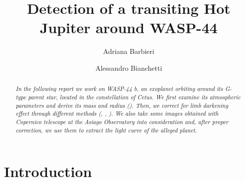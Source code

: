\documentclass[a4paper,11pt,twocolumn]{article}
\title{Detection of a transiting Hot Jupiter around WASP-44}
\author{Adriana Barbieri \and Alessandro Bianchetti}
\begin{document}
\maketitle

\begin{abstract}

\emph{In the following report we work on WASP-44 b, an exoplanet orbiting 
around its G-type parent star, located in the constellation of Cetus. 
We first examine its atmospheric parameters and derive its mass and 
radius (\cite{Morton}). Then, we correct for limb darkening effect through different methods 
(\cite{claret2011}, \cite{claret2017}, \cite{claret2018}). We also take 
some images obtained with Copernico telescope at the Asiago Observatory into consideration 
and, after proper correction, we use them to extract the light curve of 
the alleged planet.}

\end{abstract}

\section{Introduction}
\end{document}
